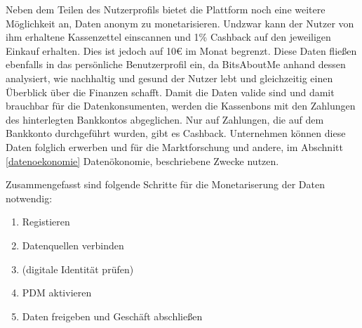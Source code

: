 \noindent Neben dem Teilen des Nutzerprofils bietet die Plattform noch eine weitere Möglichkeit an, Daten anonym zu monetarisieren. Undzwar kann der Nutzer von ihm erhaltene Kassenzettel einscannen und 1\% Cashback auf den jeweiligen Einkauf erhalten. Dies ist jedoch auf 10€ im Monat begrenzt. Diese Daten fließen ebenfalls in das persönliche Benutzerprofil ein, da BitsAboutMe anhand dessen analysiert, wie nachhaltig und gesund der Nutzer lebt und gleichzeitig einen Überblick über die Finanzen schafft. Damit die Daten valide sind und damit brauchbar für die Datenkonsumenten, werden die Kassenbons mit den Zahlungen des hinterlegten Bankkontos abgeglichen. Nur auf Zahlungen, die auf dem Bankkonto durchgeführt wurden, gibt es Cashback. Unternehmen können diese Daten folglich erwerben und für die Marktforschung und andere, im Abschnitt \ref{datenoekonomie} Datenökonomie, beschriebene Zwecke nutzen. \newline

\noindent Zusammengefasst sind folgende Schritte für die Monetariserung der Daten notwendig:
\begin{enumerate}
	\item Registieren
	\item Datenquellen verbinden
	\item (digitale Identität prüfen)
	\item PDM aktivieren
	\item Daten freigeben und Geschäft abschließen
\end{enumerate}